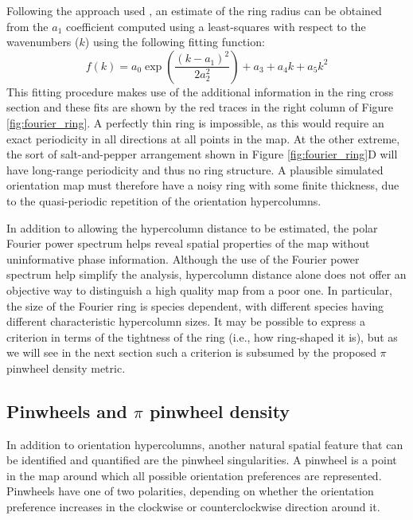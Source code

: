 \documentclass[phd,ianc,twoside]{infthesis}
\begin{document}
Following the approach used \citep{kaschube_science10}, an estimate of
the ring radius can be obtained from the $a_1$ coefficient computed
using a least-squares with respect to the wavenumbers ($k$) using the
following fitting function:
\begin{equation}
 \label{eq:kaschube_hypercolumn_fit}
f(k) = a_0 \exp \left( \frac{(k - a_1)^2}{2a_2^2} \right) + a_3 + a_4k + a_5k^2
 \end{equation}
This fitting procedure makes use of the additional information in the
ring cross section and these fits are shown by the red traces in the
right column of Figure \ref{fig:fourier_ring}. A perfectly thin ring is
impossible, as this would require an exact periodicity in all directions
at all points in the map. At the other extreme, the sort of salt-and-pepper
arrangement shown in Figure \ref{fig:fourier_ring}D will have long-range
periodicity and thus no ring structure. A plausible simulated
orientation map must therefore have a noisy ring with some finite
thickness, due to the quasi-periodic repetition of the orientation
hypercolumns.

In addition to allowing the hypercolumn distance to be estimated, the
polar Fourier power spectrum helps reveal spatial properties of the map
without uninformative phase information. Although the use of the Fourier
power spectrum help simplify the analysis, hypercolumn distance alone
does not offer an objective way to distinguish a high quality map from a
poor one. In particular, the size of the Fourier ring is species
dependent, with different species having different characteristic
hypercolumn sizes.  It may be possible to express a criterion in terms
of the tightness of the ring (i.e., how ring-shaped it is), but as we
will see in the next section such a criterion is subsumed by the
proposed $\pi$ pinwheel density metric. 


\subsection{Pinwheels and $\pi$ pinwheel density}

In addition to orientation hypercolumns, another natural spatial feature
that can be identified and quantified are the pinwheel singularities. A
pinwheel is a point in the map around which all possible orientation
preferences are represented. Pinwheels have one of two polarities,
depending on whether the orientation preference increases in the
clockwise or counterclockwise direction around it.
\end{document}
